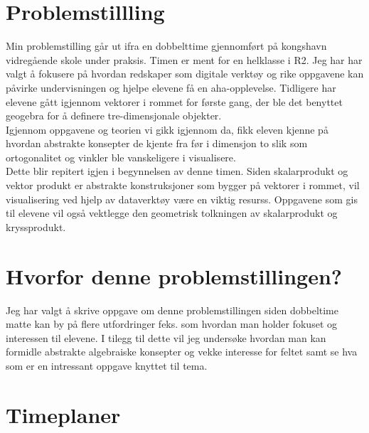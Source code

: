\documentclass{article}
\date{}
\title{}
\begin{document}
\section*{Problemstillling}
\label{sec-1}
Min problemstilling går ut ifra en dobbelttime gjennomført på kongshavn vidregående skole under praksis.
Timen er ment for en helklasse i R2. Jeg har har valgt å fokusere på hvordan redskaper som 
digitale verktøy  og rike oppgavene kan påvirke undervisningen og hjelpe elevene få en aha-opplevelse.
Tidligere har elevene gått igjennom vektorer i rommet for første gang, der ble det benyttet geogebra
for å definere tre-dimensjonale objekter.\\
Igjennom oppgavene og teorien vi gikk igjennom da, fikk eleven kjenne på hvordan abstrakte konsepter de 
kjente fra før i dimensjon to slik som ortogonalitet og vinkler ble vanskeligere i visualisere.\\
Dette blir repitert igjen i begynnelsen av denne timen. Siden skalarprodukt og vektor produkt er abstrakte konstruksjoner som bygger på vektorer i rommet,
 vil visualisering ved hjelp av dataverktøy være en viktig resurss. Oppgavene som gis til elevene vil også vektlegge den geometrisk tolkningen av skalarprodukt og kryssprodukt.\\

\section*{Hvorfor denne problemstillingen?}
Jeg har valgt å skrive oppgave om denne problemstillingen siden dobbeltime matte kan by på flere utfordringer feks. som hvordan man holder fokuset og interessen til elevene.
I tilegg til dette vil jeg undersøke hvordan man kan formidle abstrakte algebraiske konsepter og vekke interesse for feltet samt se hva som er en intressant oppgave knyttet til tema.
\newpage
\section*{Timeplaner}
\label{sec-2}
\end{document}
